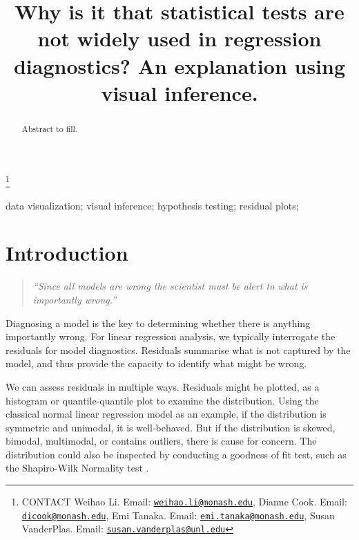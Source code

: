 \documentclass[]{interact}
\theoremstyle{plain}%
\theoremstyle{definition}
\theoremstyle{remark}
\begin{document}

\title{Why is it that statistical tests are not widely used in
regression diagnostics? An explanation using visual inference.}


\author{
}

\thanks{CONTACT Weihao
Li. Email: \href{mailto:weihao.li@monash.edu}{\nolinkurl{weihao.li@monash.edu}}, Dianne
Cook. Email: \href{mailto:dicook@monash.edu}{\nolinkurl{dicook@monash.edu}}, Emi
Tanaka. Email: \href{mailto:emi.tanaka@monash.edu}{\nolinkurl{emi.tanaka@monash.edu}}, Susan
VanderPlas. Email: \href{mailto:susan.vanderplas@unl.edu}{\nolinkurl{susan.vanderplas@unl.edu}}}

\maketitle

\begin{abstract}
Abstract to fill.
\end{abstract}

\begin{keywords}
data visualization; visual inference; hypothesis testing; residual
plots;
\end{keywords}

\hypertarget{introduction}{%
\section{Introduction}\label{introduction}}

\begin{quote}
\emph{``Since all models are wrong the scientist must be alert to what
is importantly wrong.''} \citep{box1976science}
\end{quote}

Diagnosing a model is the key to determining whether there is anything
importantly wrong. For linear regression analysis, we typically
interrogate the residuals for model diagnostics. Residuals summarise
what is not captured by the model, and thus provide the capacity to
identify what might be wrong.

We can assess residuals in multiple ways. Residuals might be plotted, as
a histogram or quantile-quantile plot to examine the distribution. Using
the classical normal linear regression model as an example, if the
distribution is symmetric and unimodal, it is well-behaved. But if the
distribution is skewed, bimodal, multimodal, or contains outliers, there
is cause for concern. The distribution could also be inspected by
conducting a goodness of fit test, such as the Shapiro-Wilk Normality
test \citep{shapiro1965analysis}.
\end{document}
